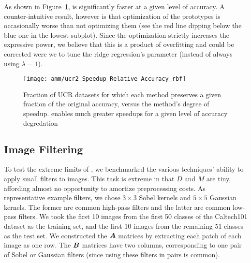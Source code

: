 As shown in Figure~\ref{fig:ucr}, \oursp is significantly faster at a given level of accuracy. A counter-intuitive result, however is that optimization of the prototypes is occasionally worse than not optimizing them (see the red line dipping below the blue one in the lowest subplot). Since the optimization strictly increases the expressive power, we believe that this is a product of overfitting and could be corrected were we to tune the ridge regression's parameter (instead of always using $\lambda = 1$). %

\begin{figure}[h]
\begin{center}
\texttt{[image: amm/ucr2\_Speedup\_Relative Accuracy\_rbf]}
\caption{Fraction of UCR datasets for which each method preserves a given fraction of the original accuracy, versus the method's degree of speedup. \oursp enables much greater speedups for a given level of accuracy degredation}
\label{fig:ucr}
\end{center}
\end{figure}

\subsection{Image Filtering}

To test the extreme limits of \ours, we benchmarked the various techniques' ability to apply small filters to images. This task is extreme in that $D$ and $M$ are tiny, affording almost no opportunity to amortize preprocessing costs. As representative example filters, we chose $3 \times 3$ Sobel kernels and $5 \times 5$ Gaussian kernels. The former are common high-pass filters and the latter are common low-pass filters. We took the first 10 images from the first 50 classes of the Caltech101 dataset as the training set, and the first 10 images from the remaining 51 classes as the test set. We constructed the $\bm{A}$ matrices by extracting each patch of each image as one row. The $\bm{B}$ matrices have two columns, corresponding to one pair of Sobel or Gaussian filters (since using these filters in pairs is common).


